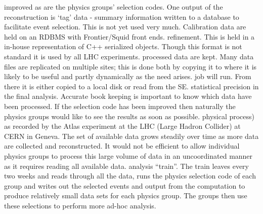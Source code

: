 \documentclass[times]{cpeauth}
\begin{document}
improved as are the physics groups' selection codes. One output of the
reconstruction is `tag' data - summary information written to a database to
facilitate event selection. This is not yet used very much. Calibration data are
held on an RDBMS with Frontier/Squid front ends.
%
%
refinement. This is held in a in-house representation of C++ serialized
objects. Though this format is not standard it is used by all LHC experiments.
%
%
processed data are kept. Many data files are replicated on multiple sites; this
is done both by copying it to where it is likely to be useful and partly
dynamically as the need arises.
%
%
job will run. From there it is either copied to a local disk or read from the
SE.
%
%
statistical precision in the final analysis. Accurate book keeping is important
to know which data have been processed. If the selection code has been improved
then naturally the physics groups would like to see the results as soon as
possible.
%
%
%
%
physical process) as recorded by the Atlas experiment at the LHC (Large Hadron
Collider) at CERN in Geneva. The set of available data grows steadily over time
as more data are collected and reconstructed. It would not be efficient to allow
individual physics groups to process this large volume of data in an
uncoordinated manner as it requires reading all available data.
%
%
analysis ``train''. The train leaves every two weeks and reads through all the
data, runs the physics selection code of each group and writes out the selected
events and output from the computation to produce relatively small data sets for
each physics group. The groups then use these selections to perform more ad-hoc
analysis.
\end{document}
